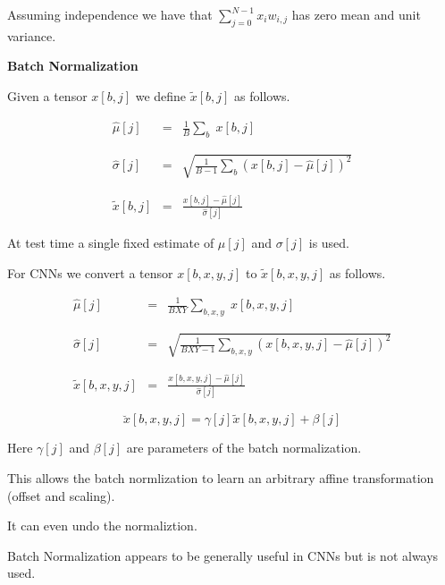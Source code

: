 {\vfill
Assuming independence we have that $\sum_{j = 0}^{N-1} x_iw_{i,j}$ has zero mean and unit variance.

\slide{}
\centerline{\bf Batch Normalization}
\vfill

Given a tensor $x[b,j]$ we define $\tilde{x}[b,j]$ as follows.

\begin{eqnarray*}
  \hat{\mu}[j] & = & \frac{1}{B} \sum_b\;x[b,j] \\
  \\
  \\
  \hat{\sigma}[j] & = & \sqrt{\frac{1}{B-1} \sum_b (x[b,j]-\hat{\mu}[j])^2} \\
  \\
  \\
  \tilde{x}[b,j]& = & \frac{x[b,j] - \hat{\mu}[j]}{\hat{\sigma}[j]}
\end{eqnarray*}


\vfill
At test time a single fixed estimate of $\mu[j]$ and $\sigma[j]$ is used.


For CNNs we convert a tensor $x[b,x,y,j]$ to $\tilde{x}[b,x,y,j]$ as follows.

\begin{eqnarray*}
  \hat{\mu}[j] & = & \frac{1}{BXY} \sum_{b,x,y}\;x[b,x,y,j] \\
  \\
  \\
  \hat{\sigma}[j] & = & \sqrt{\frac{1}{BXY-1} \sum_{b,x,y} (x[b,x,y,j]-\hat{\mu}[j])^2} \\
  \\
  \\
  \tilde{x}[b,x,y,j]& = & \frac{x[b,x,y,j] - \hat{\mu}[j]}{\hat{\sigma}[j]}
\end{eqnarray*}


$$\breve{x}[b,x,y,j] = \gamma[j] \tilde{x}[b,x,y,j] + \beta[j]$$

\vfill
Here $\gamma[j]$ and $\beta[j]$ are parameters of the batch normalization.

\vfill
This allows the batch normlization to learn an arbitrary affine transformation (offset and scaling).

\vfill
It can even undo the normaliztion.


Batch Normalization appears to be generally useful in CNNs but is not always used.

}
